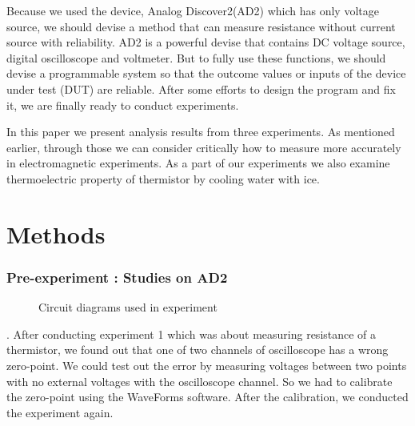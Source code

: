 \documentclass[5p,sort&compress]{elsarticle}
\begin{document}
Because we used the device, Analog Discover2(AD2) which has only voltage source, we should devise a method that can measure resistance without current source with reliability. AD2 is a powerful devise that contains DC voltage source, digital oscilloscope and voltmeter. But to fully use these functions, we should devise a programmable system so that the outcome values or inputs of the device under test (DUT) are reliable. After some efforts to design the program and fix it, we are finally ready to conduct experiments.

In this paper we present analysis results from three experiments. As mentioned earlier, through those we can consider critically how to measure more accurately in electromagnetic experiments. As a part of our experiments we also examine thermoelectric property of thermistor by cooling water with ice.


\section{Methods}
\subsubsection{Pre-experiment : Studies on AD2}

\begin{figure}[h]
\centering
    \caption{Circuit diagrams used in experiment}
\end{figure}
.
\newline
After conducting experiment 1 which was about measuring resistance of a thermistor, we found out that one of two channels of oscilloscope has a wrong zero-point. We could test out the error by measuring voltages between two points with no external voltages with the oscilloscope channel. So we had to calibrate the zero-point using the WaveForms software. After the calibration, we conducted the experiment again.
 
\end{document}
